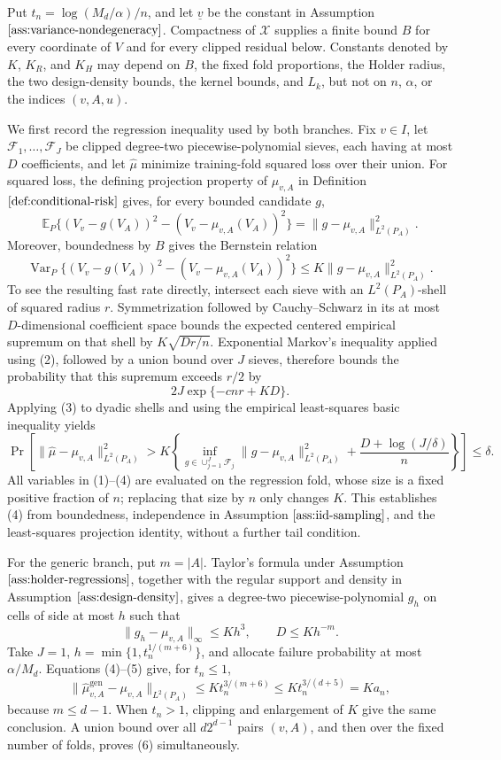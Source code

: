 Put \(t_n=\log(M_d/\alpha)/n\), and let \(\underline v\) be the constant in Assumption \(\ref{ass:variance-nondegeneracy}\). Compactness of \(\mathcal X\) supplies a finite bound \(B\) for every coordinate of \(V\) and for every clipped residual below. Constants denoted by \(K\), \(K_R\), and \(K_H\) may depend on \(B\), the fixed fold proportions, the Holder radius, the two design-density bounds, the kernel bounds, and \(L_k\), but not on \(n\), \(\alpha\), or the indices \((v,A,u)\).

We first record the regression inequality used by both branches. Fix \(v\in I\), let \(\mathcal F_1,\ldots,\mathcal F_J\) be clipped degree-two piecewise-polynomial sieves, each having at most \(D\) coefficients, and let \(\widehat\mu\) minimize training-fold squared loss over their union. For squared loss, the defining projection property of \(\mu_{v,A}\) in Definition \(\ref{def:conditional-risk}\) gives, for every bounded candidate \(g\),
\[
 \mathbb E_P\{(V_v-g(V_A))^2-(V_v-\mu_{v,A}(V_A))^2\}
 =\lVert g-\mu_{v,A}\rVert_{L^2(P_A)}^2. \tag{1}
\]
Moreover, boundedness by \(B\) gives the Bernstein relation
\[
 \operatorname{Var}_P\{(V_v-g(V_A))^2-(V_v-\mu_{v,A}(V_A))^2\}
 \le K\lVert g-\mu_{v,A}\rVert_{L^2(P_A)}^2. \tag{2}
\]
To see the resulting fast rate directly, intersect each sieve with an \(L^2(P_A)\)-shell of squared radius \(r\). Symmetrization followed by Cauchy--Schwarz in its at most \(D\)-dimensional coefficient space bounds the expected centered empirical supremum on that shell by \(K\sqrt{Dr/n}\). Exponential Markov's inequality applied using (2), followed by a union bound over \(J\) sieves, therefore bounds the probability that this supremum exceeds \(r/2\) by
\[
 2J\exp\{-c n r+K D\}. \tag{3}
\]
Applying (3) to dyadic shells and using the empirical least-squares basic inequality yields
\[
 \Pr\!\left[
 \lVert\widehat\mu-\mu_{v,A}\rVert_{L^2(P_A)}^2
 >K\left\{
 \inf_{g\in\cup_{j=1}^J\mathcal F_j}
 \lVert g-\mu_{v,A}\rVert_{L^2(P_A)}^2
 +\frac{D+\log(J/\delta)}{n}
 \right\}
 \right]\le\delta . \tag{4}
\]
All variables in (1)--(4) are evaluated on the regression fold, whose size is a fixed positive fraction of \(n\); replacing that size by \(n\) only changes \(K\). This establishes (4) from boundedness, independence in Assumption \(\ref{ass:iid-sampling}\), and the least-squares projection identity, without a further tail condition.

For the generic branch, put \(m=|A|\). Taylor's formula under Assumption \(\ref{ass:holder-regressions}\), together with the regular support and density in Assumption \(\ref{ass:design-density}\), gives a degree-two piecewise-polynomial \(g_h\) on cells of side at most \(h\) such that
\[
 \lVert g_h-\mu_{v,A}\rVert_\infty\le K h^3,
 \qquad D\le K h^{-m}. \tag{5}
\]
Take \(J=1\), \(h=\min\{1,t_n^{1/(m+6)}\}\), and allocate failure probability at most \(\alpha/M_d\). Equations (4)--(5) give, for \(t_n\le1\),
\[
 \lVert\widehat\mu^{\mathrm{gen}}_{v,A}-\mu_{v,A}\rVert_{L^2(P_A)}
 \le K t_n^{3/(m+6)}
 \le K t_n^{3/(d+5)}=K a_n, \tag{6}
\]
because \(m\le d-1\). When \(t_n>1\), clipping and enlargement of \(K\) give the same conclusion. A union bound over all \(d2^{d-1}\) pairs \((v,A)\), and then over the fixed number of folds, proves (6) simultaneously.

